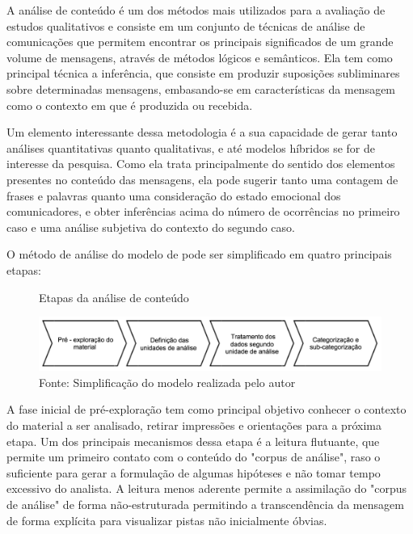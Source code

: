A análise de conteúdo é um dos métodos mais utilizados para a avaliação de estudos qualitativos e consiste em um conjunto de técnicas de análise de comunicações que permitem encontrar os principais significados de um grande volume de mensagens, através de métodos lógicos e semânticos. Ela tem como principal técnica a inferência, que consiste em produzir suposições subliminares sobre determinadas mensagens, embasando-se em características da mensagem como o contexto em que é produzida ou recebida. \cite{bardin}

Um elemento interessante dessa metodologia é a sua capacidade de gerar tanto análises quantitativas quanto qualitativas, e até modelos híbridos se for de interesse da pesquisa. Como ela trata principalmente do sentido dos elementos presentes no conteúdo das mensagens, ela pode sugerir tanto uma contagem de frases e palavras quanto uma consideração do estado emocional dos comunicadores, e obter inferências acima do número de ocorrências no primeiro caso e uma análise subjetiva do contexto do segundo caso.

O método de análise do modelo de  pode ser simplificado em quatro principais etapas:

\begin{figure}[h]
\caption{Etapas da análise de conteúdo}
\centerline{\includegraphics[scale=0.5]{img/fasesanalisedeconteudo}}
\label{fig:fasesanalisedeconteudo}
\caption* {Fonte: Simplificação do modelo  realizada pelo autor}
\end{figure}

A fase inicial de pré-exploração tem como principal objetivo conhecer o contexto do material a ser analisado, retirar impressões e orientações para a próxima etapa. Um dos principais mecanismos dessa etapa é a leitura flutuante, que permite um primeiro contato com o conteúdo do "corpus de análise", raso o suficiente para gerar a formulação de algumas hipóteses e não tomar tempo excessivo do analista. A leitura menos aderente permite a assimilação do "corpus de análise" de forma não-estruturada permitindo a transcendência da mensagem de forma explícita para visualizar pistas não inicialmente óbvias.

